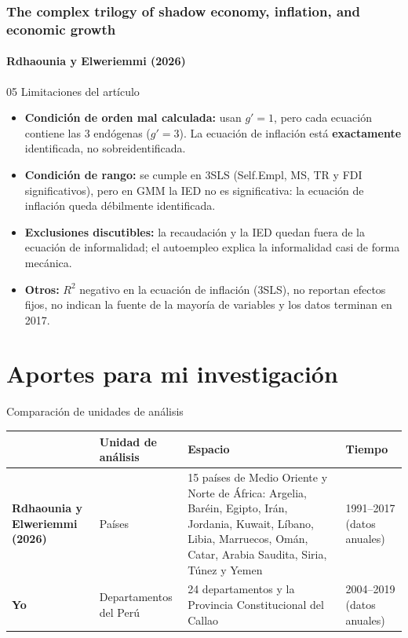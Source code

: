 \documentclass[serif, aspectratio=169]{beamer}
\newcommand{\paperframe}{%
  \frametitle{The complex trilogy of shadow economy, inflation, and economic growth}%
  \framesubtitle{Rdhaounia y Elweriemmi (2026)}}
\begin{document}
\begin{frame}
\paperframe
\begin{block}{05 \quad Limitaciones del artículo}
\small
\begin{itemize}
  \item \textbf{Condición de orden mal calculada:} usan $g'=1$, pero cada ecuación contiene las 3 endógenas ($g'=3$). La ecuación de inflación está \textbf{exactamente} identificada, no sobreidentificada.
  \item \textbf{Condición de rango:} se cumple en 3SLS (Self.Empl, MS, TR y FDI significativos), pero en GMM la IED no es significativa: la ecuación de inflación queda débilmente identificada.
  \item \textbf{Exclusiones discutibles:} la recaudación y la IED quedan fuera de la ecuación de informalidad; el autoempleo explica la informalidad casi de forma mecánica.
  \item \textbf{Otros:} $R^2$ negativo en la ecuación de inflación (3SLS), no reportan efectos fijos, no indican la fuente de la mayoría de variables y los datos terminan en 2017.
\end{itemize}
\end{block}
\end{frame}

\section{Aportes para mi investigación}

\begin{frame}{Comparación de unidades de análisis}
\centering
\footnotesize
\setlength{\tabcolsep}{4pt}
\renewcommand{\arraystretch}{1.3}
\begin{tabular}{|L{2.6cm}|L{2.6cm}|L{5.6cm}|L{2cm}|}
\hline
 & \textbf{Unidad de análisis} & \textbf{Espacio} & \textbf{Tiempo} \\
\hline
\textbf{Rdhaounia y Elweriemmi (2026)} & Países & 15 países de Medio Oriente y Norte de África: Argelia, Baréin, Egipto, Irán, Jordania, Kuwait, Líbano, Libia, Marruecos, Omán, Catar, Arabia Saudita, Siria, Túnez y Yemen & 1991--2017 (datos anuales) \\
\hline
\textbf{Yo} & Departamentos del Perú & 24 departamentos y la Provincia Constitucional del Callao & 2004--2019 (datos anuales) \\
\hline
\end{tabular}
\end{frame}
\end{document}
